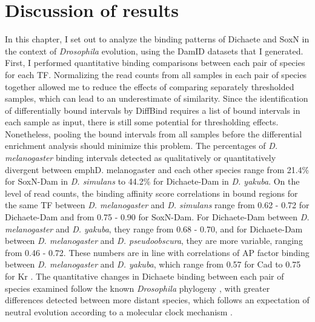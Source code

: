 \section{Discussion of results}
In this chapter, I set out to analyze the binding patterns of Dichaete and SoxN in the context of \emph{Drosophila} evolution, using the DamID datasets that I generated. First, I performed quantitative binding comparisons between each pair of species for each TF. Normalizing the read counts from all samples in each pair of species together allowed me to reduce the effects of comparing separately thresholded samples, which can lead to an underestimate of similarity. Since the identification of differentially bound intervals by DiffBind requires a list of bound intervals in each sample as input, there is still some potential for thresholding effects. Nonetheless, pooling the bound intervals from all samples before the differential enrichment analysis should minimize this problem. The percentages of \emph{D. melanogaster} binding intervals detected as qualitatively or quantitatively divergent between emph{D. melanogaster} and each other species range from 21.4\% for SoxN-Dam in \emph{D. simulans} to 44.2\% for Dichaete-Dam in \emph{D. yakuba}. On the level of read counts, the binding affinity score correlations in bound regions for the same TF between \emph{D. melanogaster} and \emph{D. simulans} range from 0.62 - 0.72 for Dichaete-Dam and from 0.75 - 0.90 for SoxN-Dam. For Dichaete-Dam between \emph{D. melanogaster} and \emph{D. yakuba}, they range from 0.68 - 0.70, and for Dichaete-Dam between \emph{D. melanogaster} and \emph{D. pseudoobscura}, they are more variable, ranging from 0.46 - 0.72. These numbers are in line with correlations of AP factor binding between \emph{D. melanogaster} and \emph{D. yakuba}, which range from 0.57 for Cad to 0.75 for Kr \citep{bradley_binding_2010}. The quantitative changes in Dichaete binding between each pair of species examined follow the known \emph{Drosophila} phylogeny \citep{russo_molecular_1995}, with greater differences detected between more distant species, which follows an expectation of neutral evolution according to a molecular clock mechanism \citep{he_high_2011}.\\

